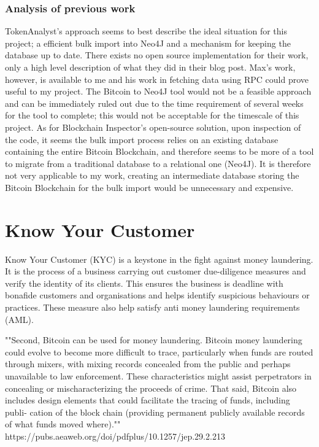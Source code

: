 \subsubsection{Analysis of previous work}
TokenAnalyst's approach seems to best describe the ideal situation for this project; a efficient bulk import into Neo4J and a mechanism for keeping the database up to date. There exists no open source implementation for their work, only a high level description of what they did in their blog post. Max's work, however, is available to me and his work in fetching data using RPC could prove useful to my project. The Bitcoin to Neo4J tool would not be a feasible approach and can be immediately ruled out due to the time requirement of several weeks for the tool to complete; this would not be acceptable for the timescale of this project. As for Blockchain Inspector's open-source solution, upon inspection of the code, it seems the bulk import process relies on an existing database containing the entire Bitcoin Blockchain, and therefore seems to be more of a tool to migrate from a traditional database to a relational one (Neo4J). It is therefore not very applicable to my work, creating an intermediate database storing the Bitcoin Blockchain for the bulk import would be unnecessary and expensive.

\section{Know Your Customer}\label{background-kyc}
Know Your Customer (KYC) is a keystone in the fight against money laundering. It is the process of a business carrying out customer due-diligence measures and verify the identity of its clients. This ensures the business is deadline with bonafide customers and organisations and helps identify suspicious behaviours or practices. These measure also help satisfy anti money laundering requirements (AML). 

""Second, Bitcoin can be used for money laundering. Bitcoin money laundering could evolve to become more difficult to trace, particularly when funds are routed through mixers, with mixing records concealed from the public and perhaps unavailable to law enforcement. These characteristics might assist perpetrators in concealing or mischaracterizing the proceeds of crime. That said, Bitcoin also includes design elements that could facilitate the tracing of funds, including publi- cation of the block chain (providing permanent publicly available records of what funds moved where)."" https://pubs.aeaweb.org/doi/pdfplus/10.1257/jep.29.2.213

